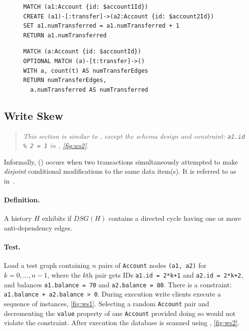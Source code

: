 \begin{figure}[htb]
  \centering
  \begin{minipage}{0.41\linewidth}
    \begin{lstlisting}[language=cypher,label=fig:lu1,caption=\tx{Lost Update $T_\mathrm{W}$}.]
MATCH (a1:Account {id: $account1Id})
CREATE (a1)-[:transfer]->(a2:Account {id: $account2Id})
SET a1.numTransferred = a1.numTransferred + 1
RETURN a1.numTransferred
\end{lstlisting}
  \end{minipage}
  \quad
  \begin{minipage}{0.52\linewidth}
    \begin{lstlisting}[language=cypher,label=fig:lu2,caption=\tx{Lost Update $T_\mathrm{R}$}.]
MATCH (a:Account {id: $accountId})
OPTIONAL MATCH (a)-[t:transfer]->()
WITH a, count(t) AS numTransferEdges
RETURN numTransferEdges,
  a.numTransferred AS numTransferred
\end{lstlisting}
  \end{minipage}
\end{figure}

\subsection{Write Skew}
\label{sec:write-skew}

\begin{quote}
  \textit{This section is similar to \ldbcsnb, except the schema design and
    constraint: \texttt{a1.id \% 2 = 1} in , \autoref{fig:ws2}.
  }
\end{quote}

Informally,  () occurs when two transactions
simultaneously attempted to make \emph{disjoint} conditional modifications to
the same data item(s). It is referred to as 
in~\cite{adya1999weak,DBLP:journals/tods/FeketeLOOS05}.

\paragraph{Definition.}
A history $H$ exhibits  if $\textit{DSG}(H)$ contains a directed
cycle having one or more anti-dependency edges.

\paragraph{Test.}
Load a test graph containing $n$ pairs of \texttt{Account} nodes
\texttt{(a1, a2)} for $k = 0, \ldots, n-1$, where the $k$th pair gets IDs
\texttt{a1.id = 2*k+1} and \texttt{a2.id = 2*k+2}, and balances
\texttt{a1.balance = 70} and \texttt{a2.balance = 80}. There is a constraint:
\texttt{a1.balance + a2.balance > 0}. During execution write clients execute a
sequence of  instances, \autoref{fig:ws1}. Selecting a
random \texttt{Account} pair and decrementing the \texttt{value} property of
one \texttt{Account} provided doing so would not violate the constraint. After
execution the database is scanned using , \autoref{fig:ws2}.

